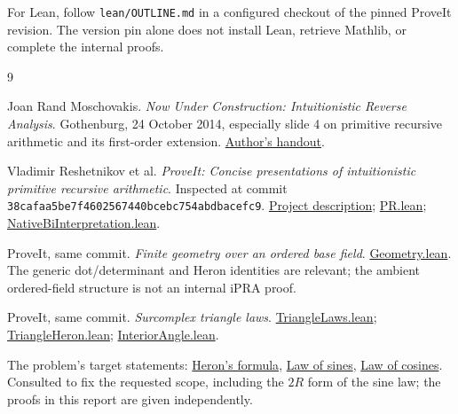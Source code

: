 \documentclass[11pt,a4paper]{article}
\theoremstyle{definition}
\newcommand{\code}[1]{\texttt{\small #1}}
\numberwithin{equation}{section}
\begin{document}
For Lean, follow \code{lean/OUTLINE.md} in a configured checkout
of the pinned ProveIt revision. The version pin alone does not
install Lean, retrieve Mathlib, or complete the internal proofs.

\begin{thebibliography}{9}

Joan Rand Moschovakis.
\emph{Now Under Construction: Intuitionistic Reverse Analysis}.
Gothenburg, 24 October 2014, especially slide 4 on primitive
recursive arithmetic and its first-order extension.
\href{https://www.math.ucla.edu/~joan/techgothenburghandout.pdf}{Author's handout}.

Vladimir Reshetnikov et al. \emph{ProveIt: Concise presentations
of intuitionistic primitive recursive arithmetic}.
Inspected at commit \code{38cafaa5be7f4602567440bcebc754abdbacefc9}.
\href{https://github.com/VladimirReshetnikov/ProveIt/blob/38cafaa5be7f4602567440bcebc754abdbacefc9/Logic/PrimitiveRecursiveArithmetic/ConciseIPRA/README.md}{Project description};
\href{https://github.com/VladimirReshetnikov/ProveIt/blob/38cafaa5be7f4602567440bcebc754abdbacefc9/Logic/PrimitiveRecursiveArithmetic/ConciseIPRA/Lean/ConciseIPRA/PR.lean}{PR.lean};
\href{https://github.com/VladimirReshetnikov/ProveIt/blob/38cafaa5be7f4602567440bcebc754abdbacefc9/Logic/PrimitiveRecursiveArithmetic/ConciseIPRA/Lean/ConciseIPRA/NativeBiInterpretation.lean}{NativeBiInterpretation.lean}.

ProveIt, same commit.
\emph{Finite geometry over an ordered base field}.
\href{https://github.com/VladimirReshetnikov/ProveIt/blob/38cafaa5be7f4602567440bcebc754abdbacefc9/Algebra/SurrealNumbers/Surreal/Algebra/Geometry.lean}{Geometry.lean}.
The generic dot/determinant and Heron identities are relevant;
the ambient ordered-field structure is not an internal iPRA proof.

ProveIt, same commit.
\emph{Surcomplex triangle laws}.
\href{https://github.com/VladimirReshetnikov/ProveIt/blob/38cafaa5be7f4602567440bcebc754abdbacefc9/Algebra/SurrealNumbers/Surreal/Surcomplex/TriangleLaws.lean}{TriangleLaws.lean};
\href{https://github.com/VladimirReshetnikov/ProveIt/blob/38cafaa5be7f4602567440bcebc754abdbacefc9/Algebra/SurrealNumbers/Surreal/Surcomplex/TriangleHeron.lean}{TriangleHeron.lean};
\href{https://github.com/VladimirReshetnikov/ProveIt/blob/38cafaa5be7f4602567440bcebc754abdbacefc9/Algebra/SurrealNumbers/Surreal/Surcomplex/InteriorAngle.lean}{InteriorAngle.lean}.

The problem's target statements:
\href{https://en.wikipedia.org/wiki/Heron%27s_formula}{Heron's formula},
\href{https://en.wikipedia.org/wiki/Law_of_sines}{Law of sines},
\href{https://en.wikipedia.org/wiki/Law_of_cosines}{Law of cosines}.
Consulted to fix the requested scope, including the \(2R\) form
of the sine law; the proofs in this report are given independently.
\end{thebibliography}
\end{document}
